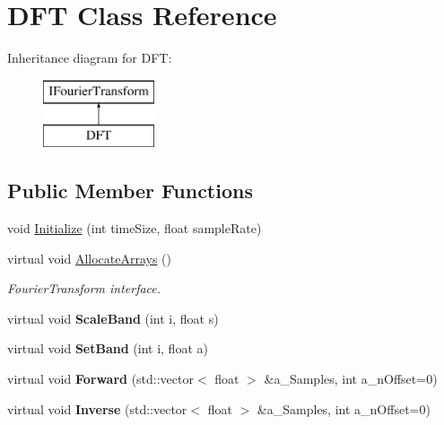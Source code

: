 \hypertarget{class_d_f_t}{}\section{D\+FT Class Reference}
\label{class_d_f_t}
Inheritance diagram for D\+FT\+:\begin{figure}[H]
\begin{center}
\leavevmode
\includegraphics[height=2.000000cm]{class_d_f_t}
\end{center}
\end{figure}
\subsection*{Public Member Functions}
\begin{DoxyCompactItemize}
\item 
void \hyperlink{class_d_f_t_a6d875398a127f4ba5d21cb0ad9ef370b}{Initialize} (int time\+Size, float sample\+Rate)
\item 
\mbox{\label{class_d_f_t_ad211ae3ef47bc3a600a6e6a1f4b80645}} 
virtual void \hyperlink{class_d_f_t_ad211ae3ef47bc3a600a6e6a1f4b80645}{Allocate\+Arrays} ()
\begin{DoxyCompactList}\small\item\em Fourier\+Transform interface. \end{DoxyCompactList}\item 
\mbox{\label{class_d_f_t_a309b8cc11df7a9da7ffb639205f4592f}} 
virtual void {\bfseries Scale\+Band} (int i, float s)
\item 
\mbox{\label{class_d_f_t_ae9a74e8d1ec2df33bb82f6b2b5fcb7be}} 
virtual void {\bfseries Set\+Band} (int i, float a)
\item 
\mbox{\label{class_d_f_t_ab4135f3e10bf43ce69ce4a63a82a20b0}} 
virtual void {\bfseries Forward} (std\+::vector$<$ float $>$ \&a\+\_\+\+Samples, int a\+\_\+n\+Offset=0)
\item 
\mbox{\label{class_d_f_t_ab5ba9360f68db15eb4c61eab019df0d0}} 
virtual void {\bfseries Inverse} (std\+::vector$<$ float $>$ \&a\+\_\+\+Samples, int a\+\_\+n\+Offset=0)
\end{DoxyCompactItemize}
